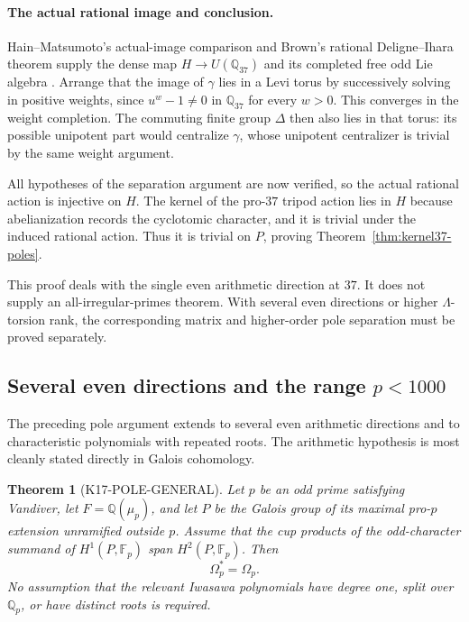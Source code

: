 \documentclass[11pt,a4paper]{article}
\newtheorem{theorem}{Theorem}[section]
\theoremstyle{definition}
\begin{document}
\paragraph{The actual rational image and conclusion.}
Hain--Matsumoto's actual-image comparison and Brown's rational Deligne--Ihara theorem supply the dense map $H\to U(\mathbb Q_{37})$ and its completed free odd Lie algebra \cite[Proposition~8.3, Theorem~8.4]{HainMatsumoto2001}\cite[\S2.1--2.3]{Brown2019}. Arrange that the image of $\gamma$ lies in a Levi torus by successively solving in positive weights, since $u^w-1\ne0$ in $\mathbb Q_{37}$ for every $w>0$. This converges in the weight completion. The commuting finite group $\Delta$ then also lies in that torus: its possible unipotent part would centralize $\gamma$, whose unipotent centralizer is trivial by the same weight argument.

All hypotheses of the separation argument are now verified, so the actual rational action is injective on $H$. The kernel of the pro-$37$ tripod action lies in $H$ because abelianization records the cyclotomic character, and it is trivial under the induced rational action. Thus it is trivial on $P$, proving Theorem~\ref{thm:kernel37-poles}.

This proof deals with the single even arithmetic direction at $37$. It does not supply an all-irregular-primes theorem. With several even directions or higher $\Lambda$-torsion rank, the corresponding matrix and higher-order pole separation must be proved separately.

\subsection{Several even directions and the range \texorpdfstring{$p<1000$}{p<1000}}
\label{sec:multieven-poles}

The preceding pole argument extends to several even arithmetic directions and to characteristic polynomials with repeated roots. The arithmetic hypothesis is most cleanly stated directly in Galois cohomology.

\begin{theorem}[K17-POLE-GENERAL]\label{thm:pole-general}
Let $p$ be an odd prime satisfying Vandiver, let $F=\mathbb Q(\mu_p)$, and let $P$ be the Galois group of its maximal pro-$p$ extension unramified outside $p$. Assume that the cup products of the odd-character summand of $H^1(P,\mathbb F_p)$ span $H^2(P,\mathbb F_p)$. Then
\[
 \Omega_p^*=\Omega_p.
\]
No assumption that the relevant Iwasawa polynomials have degree one, split over $\mathbb Q_p$, or have distinct roots is required.
\end{theorem}
\end{document}
